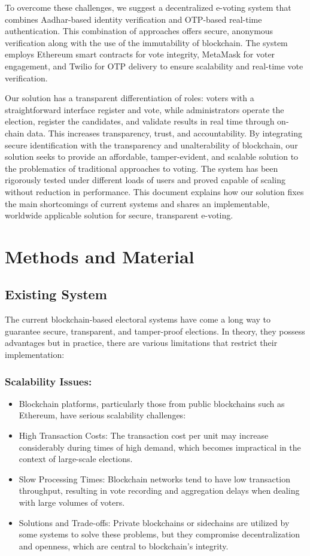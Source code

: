 \documentclass[conference]{IEEEtran}
\begin{document}
To overcome these challenges, we suggest a decentralized e-voting system that combines Aadhar-based identity verification and OTP-based real-time authentication. This combination of approaches offers secure, anonymous verification along with the use of the immutability of blockchain. The system employs Ethereum smart contracts for vote integrity, MetaMask for voter engagement, and Twilio for OTP delivery to ensure scalability and real-time vote verification.

Our solution has a transparent differentiation of roles: voters with a straightforward interface register and vote, while administrators operate the election, register the candidates, and validate results in real time through on-chain data. This increases transparency, trust, and accountability.
By integrating secure identification with the transparency and unalterability of blockchain, our solution seeks to provide an affordable, tamper-evident, and scalable solution to the problematics of traditional approaches to voting. The system has been rigorously tested under different loads of users and proved capable of scaling without reduction in performance. This document explains how our solution fixes the main shortcomings of current systems and shares an implementable, worldwide applicable solution for secure, transparent e-voting.



\section{Methods and Material}

\subsection {Existing System}
The current blockchain-based electoral systems have come a long way to guarantee secure, transparent, and tamper-proof elections. In theory, they possess advantages but in practice, there are various limitations that restrict their implementation:

\subsubsection{Scalability Issues:  }
  \begin{itemize}
      \item Blockchain platforms, particularly those from public blockchains such as Ethereum, have serious scalability challenges:
      \item High Transaction Costs: The transaction cost per unit may increase considerably during times of high demand, which becomes impractical in the context of large-scale elections.
      \item Slow Processing Times: Blockchain networks tend to have low transaction throughput, resulting in vote recording and aggregation delays when dealing with large volumes of voters. 
      \item Solutions and Trade-offs: Private blockchains or sidechains are utilized by some systems to solve these problems, but they compromise decentralization and openness, which are central to blockchain's integrity.
  \end{itemize}
\end{document}
